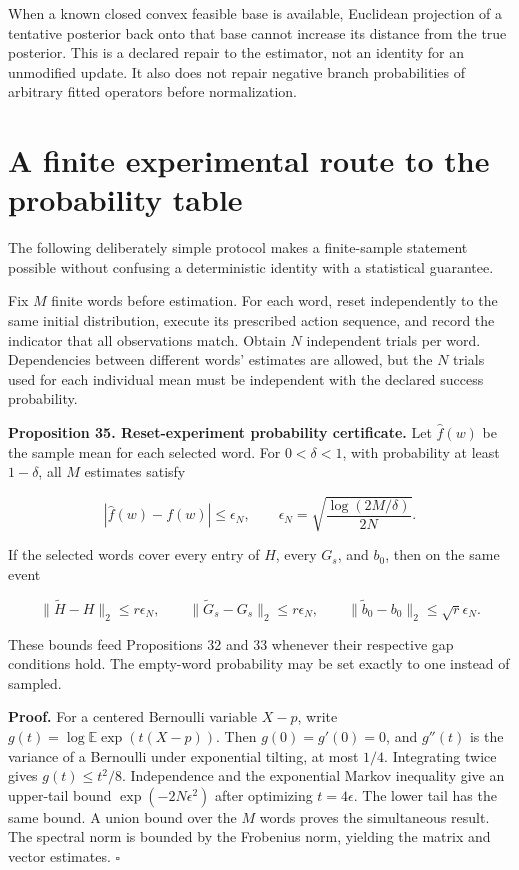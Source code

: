 When a known closed convex feasible base is available, Euclidean
projection of a tentative posterior back onto that base cannot increase
its distance from the true posterior. This is a declared repair to the
estimator, not an identity for an unmodified update. It also does not
repair negative branch probabilities of arbitrary fitted operators
before normalization.

\section{A finite experimental route to the probability table}\label{LSM:a-finite-experimental-route-to-the-probability-table}

The following deliberately simple protocol makes a finite-sample
statement possible without confusing a deterministic identity with a
statistical guarantee.

Fix \(M\) finite words before estimation. For each word, reset
independently to the same initial distribution, execute its prescribed
action sequence, and record the indicator that all observations match.
Obtain \(N\) independent trials per word. Dependencies between different
words' estimates are allowed, but the \(N\) trials used for each
individual mean must be independent with the declared success
probability.

\textbf{Proposition 35. Reset-experiment probability certificate.} Let
\(\widehat f(w)\) be the sample mean for each selected word. For
\(0<\delta<1\), with probability at least \(1-\delta\), all \(M\)
estimates satisfy

\[
|\widehat f(w)-f(w)|\leq
\epsilon_N,\qquad
\epsilon_N=\sqrt{\frac{\log(2M/\delta)}{2N}}.
\]

If the selected words cover every entry of \(H\), every \(G_s\), and
\(b_0\), then on the same event

\[
\|\widetilde H-H\|_2\leq r\epsilon_N,\qquad
\|\widetilde G_s-G_s\|_2\leq r\epsilon_N,\qquad
\|\widetilde b_0-b_0\|_2\leq\sqrt r\epsilon_N.
\]

These bounds feed Propositions 32 and 33 whenever their respective gap
conditions hold. The empty-word probability may be set exactly to one
instead of sampled.

\textbf{Proof.} For a centered Bernoulli variable \(X-p\), write
\(g(t)=\log\mathbb E\exp(t(X-p))\). Then \(g(0)=g'(0)=0\), and
\(g''(t)\) is the variance of a Bernoulli under exponential tilting, at
most \(1/4\). Integrating twice gives \(g(t)\leq t^2/8\). Independence
and the exponential Markov inequality give an upper-tail bound
\(\exp(-2N\epsilon^2)\) after optimizing \(t=4\epsilon\). The lower tail
has the same bound. A union bound over the \(M\) words proves the
simultaneous result. The spectral norm is bounded by the Frobenius norm,
yielding the matrix and vector estimates. \(\square\)

